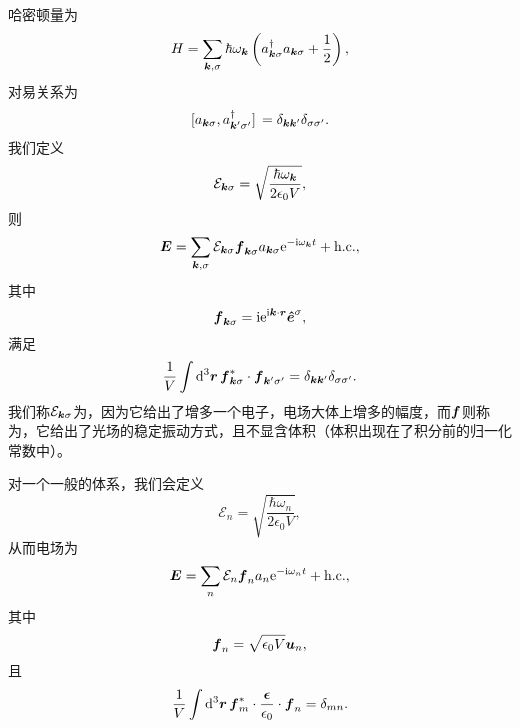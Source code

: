 哈密顿量为
\begin{equation}
    H = \sum_{\vb*{k}, \sigma} \hbar \omega_{\vb*{k}} \left( a^\dagger_{\vb*{k} \sigma} a_{\vb*{k} \sigma} + \frac{1}{2} \right),
\end{equation}
对易关系为
\begin{equation}
    \comm*{a_{\vb*{k} \sigma}}{a_{\vb*{k}' \sigma'}^\dagger} = \delta_{\vb*{k} \vb*{k}'} \delta_{\sigma \sigma'}.
\end{equation}
我们定义
\begin{equation}
    \mathcal{E}_{\vb*{k} \sigma} = \sqrt{\frac{\hbar \omega_{\vb*{k}}}{2 \epsilon_0 V}},
\end{equation}
则
\begin{equation}
    \vb*{E} = \sum_{\vb*{k}, \sigma} \mathcal{E}_{\vb*{k} \sigma} \vb*{f}_{\vb*{k} \sigma} a_{\vb*{k} \sigma} \mathrm{e}^{- \mathrm{i} \omega_{\vb*{k}} t} + \text{h.c.},
\end{equation}
其中
\begin{equation}
    \vb*{f}_{\vb*{k} \sigma} = \mathrm{i} \mathrm{e}^{\mathrm{i} \vb*{k} \cdot \vb*{r}} \vu*{e}^\sigma,
\end{equation}
满足
\begin{equation}
    \frac{1}{V} \int \dd[3]{\vb*{r}} \vb*{f}^*_{\vb*{k} \sigma} \cdot \vb*{f}_{\vb*{k}' \sigma'} = \delta_{\vb*{k} \vb*{k}'} \delta_{\sigma \sigma'}.
\end{equation}
我们称$\mathcal{E}_{\vb*{k} \sigma}$为，因为它给出了增多一个电子，电场大体上增多的幅度，而$\vb*{f}$则称为，它给出了光场的稳定振动方式，且不显含体积（体积出现在了积分前的归一化常数中）。

对一个一般的体系，我们会定义
\begin{equation}
    \mathcal{E}_{n} = \sqrt{\frac{\hbar \omega_n}{2 \epsilon_0 V}},
\end{equation}
从而电场为
\begin{equation}
    \vb*{E} = \sum_n \mathcal{E}_n \vb*{f}_{n} a_n \mathrm{e}^{- \mathrm{i} \omega_n t} + \text{h.c.},
\end{equation}
其中
\begin{equation}
    \vb*{f}_n = \sqrt{\epsilon_0 V} \vb*{u}_n,
\end{equation}
且
\begin{equation}
    \frac{1}{V} \int \dd[3]{\vb*{r}} \vb*{f}_m^* \cdot \frac{\vb*{\epsilon}}{\epsilon_0} \cdot \vb*{f}_n = \delta_{mn}.
\end{equation}

